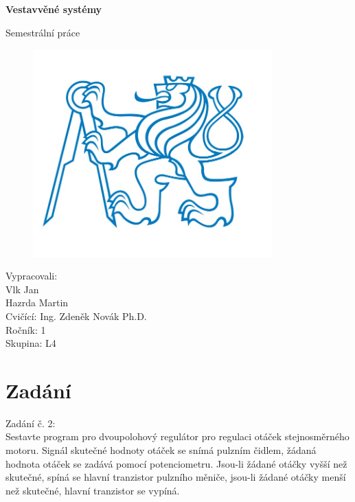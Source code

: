 \documentclass[12pt,a4paper]{article}
\begin{document}
	\begin{titlepage}
		\begin{center}
			\vspace{5cm}
			
			\Huge
			\textbf{Vestavvěné systémy}
			
			\vspace{0.5cm}
			\LARGE
			Semestrální práce
			
			\vspace{1.5cm}
			\begin{figure}[h]
				\centering
				\includegraphics[height=8cm]{logo}

			\end{figure}
			
			\vfill
			
			
			\vspace{0.8cm}			
			
		\end{center}
		\begin{flushleft}
			Vypracovali:\\ 
			\hspace{1cm}Vlk Jan \\
			\hspace{1cm}Hazrda Martin \\
			
			Cvičící: Ing. Zdeněk Novák Ph.D.\\
			Ročník: 1\\
			Skupina: L4\\
			
		\end{flushleft}
	\end{titlepage}
	

\newpage

\section*{Zadání}
Zadání č. 2:\\
Sestavte program pro dvoupolohový regulátor pro regulaci otáček stejnosměrného motoru. Signál skutečné hodnoty otáček se snímá pulzním čidlem, žádaná hodnota otáček se zadává pomocí potenciometru. Jsou-li žádané otáčky vyšší než skutečné, spíná se hlavní tranzistor pulzního měniče, jsou-li žádané otáčky menší než skutečné, hlavní tranzistor se vypíná.
\end{document}
